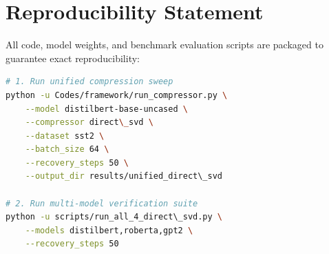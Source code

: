 \section{Reproducibility Statement}
All code, model weights, and benchmark evaluation scripts are packaged to guarantee exact reproducibility:
\begin{lstlisting}[language=bash]
# 1. Run unified compression sweep
python -u Codes/framework/run_compressor.py \
    --model distilbert-base-uncased \
    --compressor direct\_svd \
    --dataset sst2 \
    --batch_size 64 \
    --recovery_steps 50 \
    --output_dir results/unified_direct\_svd

# 2. Run multi-model verification suite
python -u scripts/run_all_4_direct\_svd.py \
    --models distilbert,roberta,gpt2 \
    --recovery_steps 50
\end{lstlisting}
